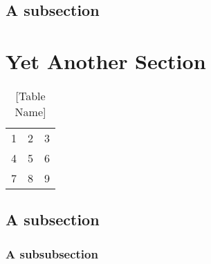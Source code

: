 \subsection{A subsection}
\lipsum[5-6] %

\section{Yet Another Section}
\lipsum[1] %
\begin{table}
\begin{center}
\begin{tabular}{ l c r }
  1 & 2 & 3 \\
  4 & 5 & 6 \\
  7 & 8 & 9 \\
\end{tabular}
\end{center}
\caption{[Table Name]}
\end{table}
\lipsum[2]

\subsection{A subsection}\label{sec:another}
\lipsum[3]

\subsubsection{A subsubsection}\label{sec:minorstuff}
\lipsum[4]


